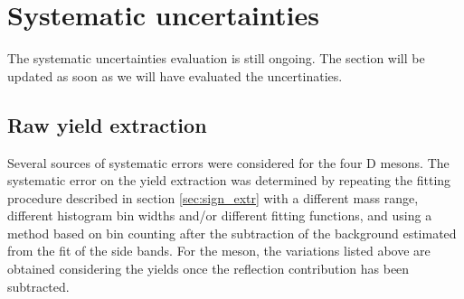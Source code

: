 \clearpage
\section{Systematic uncertainties}
The systematic uncertainties evaluation is still ongoing. The section will be updated as soon as we will have evaluated the uncertinaties. 
\subsection{Raw yield extraction}
\label{sec:raw_yield_syst}
Several sources of systematic errors were considered for the four D mesons. The systematic error on the yield extraction was determined by repeating the fitting procedure described in section \ref{sec:sign_extr} with a different mass range, different histogram bin widths and/or different fitting functions, and using a method based on bin counting after the subtraction of the background estimated from the fit of the side bands. For the \Dzero meson, the variations listed above are obtained considering the yields once the reflection contribution has been subtracted.

